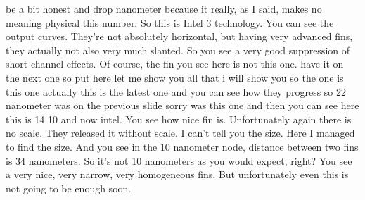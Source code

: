 be a bit honest and drop nanometer because it really, as I said, makes no meaning physical this number. So this is Intel 3 technology. You can see the output curves. They're not absolutely horizontal, but having very advanced fins, they actually not also very much slanted.
So you see a very good suppression of short channel effects. Of course, the fin you see here is not this one. have it on the next one so put here let me show you all that i will show you so the one is this one actually this is the latest one and you can see how they progress so 22 nanometer was on the previous slide sorry was this one and then you can see here this is 14 10 and now intel. You see how nice fin is. Unfortunately again there is no scale. They released it without scale. I can't tell you the size. Here I managed to find the size. And you see in the 10 nanometer node, distance between two fins is 34 nanometers. So it's not 10 nanometers as you would expect, right? You see a very nice, very narrow, very homogeneous fins. But unfortunately even this is not going to be enough soon.\\

